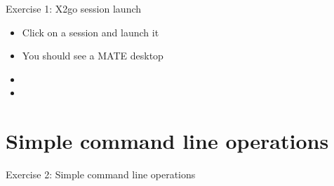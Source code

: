 \documentclass[handout]{beamer} %
\begin{document}
{\begin{frame}{Exercise 1: X2go session launch }
\begin{minipage}{0.5\textwidth}
\begin{figure}[H]
\end{figure}
\end{minipage} \hfill
\begin{minipage}{0.35\textwidth}
\begin{itemize}
\item Click on a session and launch it
\item You should see a MATE desktop
\item {\color{red}{Demonstration}} 
\item {\color{red}{Troubleshooting}}
\end{itemize}
\end{minipage}

\end{frame}
}

{
\section{Simple command line operations}
%
\begin{frame}{Exercise 2: Simple command line operations}
\begin{minipage}{0.5\textwidth}
\begin{figure}[H]

\end{figure}
\end{minipage}
\end{frame}}
\end{document}
